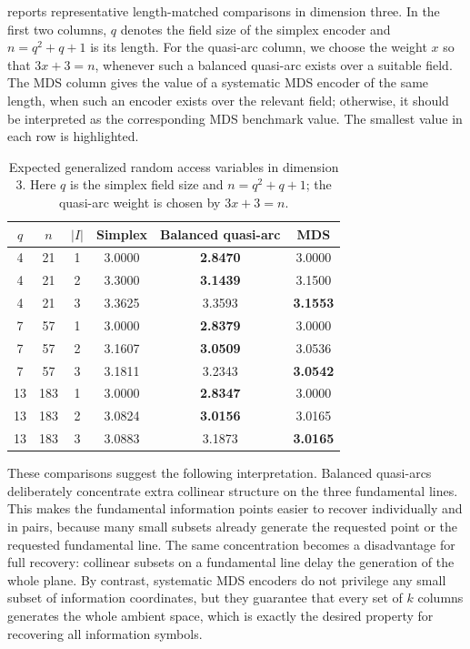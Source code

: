 \documentclass[11pt,a4paper]{article}
\numberwithin{equation}{section}
\theoremstyle{definition}
\theoremstyle{definition}
\begin{document}
 reports representative length-matched comparisons in dimension three.  In the first two columns, $q$ denotes the field size of the simplex encoder and $n=q^2+q+1$ is its length.  For the quasi-arc column, we choose the weight $x$ so that $3x+3=n$, whenever such a balanced quasi-arc exists over a suitable field.  The MDS column gives the value of a systematic MDS encoder of the same length, when such an encoder exists over the relevant field; otherwise, it should be interpreted as the corresponding MDS benchmark value.  The smallest value in each row is highlighted.

\begin{table}[ht]
\centering
\small
\begin{tabular}{cccccc}
\toprule
$q$ & $n$ & $|I|$ & Simplex & Balanced quasi-arc & MDS \\
\midrule
4 & 21  & 1 & 3.0000 & \textbf{2.8470} & 3.0000 \\
4 & 21  & 2 & 3.3000 & \textbf{3.1439} & 3.1500 \\
4 & 21  & 3 & 3.3625 & 3.3593 & \textbf{3.1553} \\
\midrule
7 & 57  & 1 & 3.0000 & \textbf{2.8379} & 3.0000 \\
7 & 57  & 2 & 3.1607 & \textbf{3.0509} & 3.0536 \\
7 & 57  & 3 & 3.1811 & 3.2343 & \textbf{3.0542} \\
\midrule
13 & 183 & 1 & 3.0000 & \textbf{2.8347} & 3.0000 \\
13 & 183 & 2 & 3.0824 & \textbf{3.0156} & 3.0165 \\
13 & 183 & 3 & 3.0883 & 3.1873 & \textbf{3.0165} \\
\bottomrule
\end{tabular}
\caption{Expected generalized random access variables in dimension $3$.  Here $q$ is the simplex field size and $n=q^2+q+1$; the quasi-arc weight is chosen by $3x+3=n$.}
\label{tab:numerics}
\end{table}

These comparisons suggest the following interpretation.  Balanced quasi-arcs deliberately concentrate extra collinear structure on the three fundamental lines.  This makes the fundamental information points easier to recover individually and in pairs, because many small subsets already generate the requested point or the requested fundamental line.  The same concentration becomes a disadvantage for full recovery: collinear subsets on a fundamental line delay the generation of the whole plane.  By contrast, systematic MDS encoders do not privilege any small subset of information coordinates, but they guarantee that every set of $k$ columns generates the whole ambient space, which is exactly the desired property for recovering all information symbols.
\end{document}
